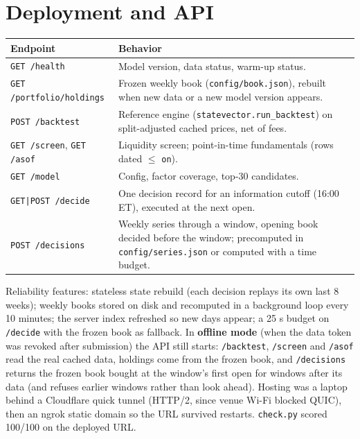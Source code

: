 \documentclass[11pt]{article}
\newcommand{\code}[1]{\texttt{#1}}
\begin{document}
\section{Deployment and API}

\begin{table}[H]\centering\small
\begin{tabularx}{\textwidth}{lL}
\toprule
Endpoint & Behavior \\
\midrule
\code{GET /health} & Model version, data status, warm-up status. \\
\code{GET /portfolio/holdings} & Frozen weekly book (\code{config/book.json}), rebuilt when new data or a new model version appears. \\
\code{POST /backtest} & Reference engine (\code{statevector.run\_backtest}) on split-adjusted cached prices, net of fees. \\
\code{GET /screen}, \code{GET /asof} & Liquidity screen; point-in-time fundamentals (rows dated $\le$ \code{on}). \\
\code{GET /model} & Config, factor coverage, top-30 candidates. \\
\code{GET|POST /decide} & One decision record for an information cutoff (16:00 ET), executed at the next open. \\
\code{POST /decisions} & Weekly series through a window, opening book decided before the window; precomputed in \code{config/series.json} or computed with a time budget. \\
\bottomrule
\end{tabularx}
\end{table}

\noindent Reliability features: stateless state rebuild (each decision replays its own last 8 weeks); weekly books
stored on disk and recomputed in a background loop every 10 minutes; the server index refreshed so new days appear;
a 25 s budget on \code{/decide} with the frozen book as fallback. In \textbf{offline mode} (when the data token was
revoked after submission) the API still starts: \code{/backtest}, \code{/screen} and \code{/asof} read the real cached
data, holdings come from the frozen book, and \code{/decisions} returns the frozen book bought at the window's first
open for windows after its data (and refuses earlier windows rather than look ahead). Hosting was a laptop behind a
Cloudflare quick tunnel (HTTP/2, since venue Wi-Fi blocked QUIC), then an ngrok static domain so the URL survived
restarts. \code{check.py} scored 100/100 on the deployed URL.
\end{document}
